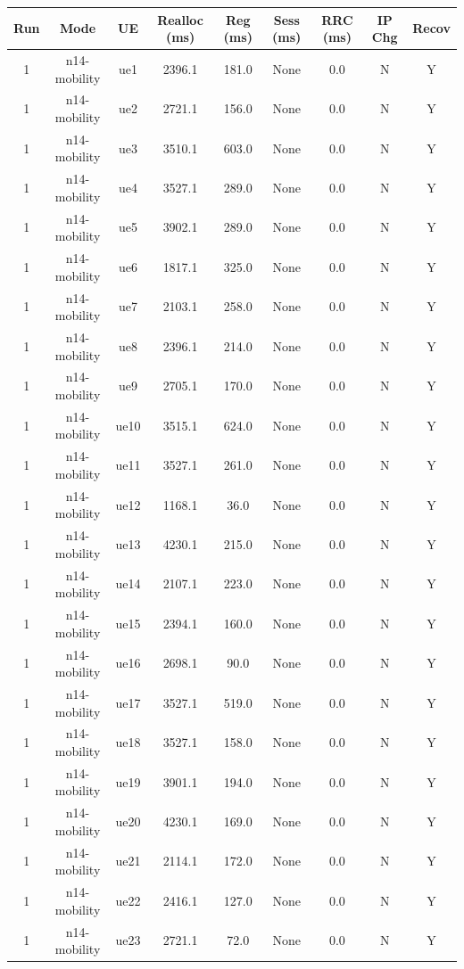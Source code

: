 \begin{table}[ht]
\centering
\begin{tabular}{|c|c|c|c|c|c|c|c|c|}
\hline
Run & Mode & UE & Realloc (ms) & Reg (ms) & Sess (ms) & RRC (ms) & IP Chg & Recov \\
\hline
1 & n14-mobility & ue1 & 2396.1 & 181.0 & None & 0.0 & N & Y \\
1 & n14-mobility & ue2 & 2721.1 & 156.0 & None & 0.0 & N & Y \\
1 & n14-mobility & ue3 & 3510.1 & 603.0 & None & 0.0 & N & Y \\
1 & n14-mobility & ue4 & 3527.1 & 289.0 & None & 0.0 & N & Y \\
1 & n14-mobility & ue5 & 3902.1 & 289.0 & None & 0.0 & N & Y \\
1 & n14-mobility & ue6 & 1817.1 & 325.0 & None & 0.0 & N & Y \\
1 & n14-mobility & ue7 & 2103.1 & 258.0 & None & 0.0 & N & Y \\
1 & n14-mobility & ue8 & 2396.1 & 214.0 & None & 0.0 & N & Y \\
1 & n14-mobility & ue9 & 2705.1 & 170.0 & None & 0.0 & N & Y \\
1 & n14-mobility & ue10 & 3515.1 & 624.0 & None & 0.0 & N & Y \\
1 & n14-mobility & ue11 & 3527.1 & 261.0 & None & 0.0 & N & Y \\
1 & n14-mobility & ue12 & 1168.1 & 36.0 & None & 0.0 & N & Y \\
1 & n14-mobility & ue13 & 4230.1 & 215.0 & None & 0.0 & N & Y \\
1 & n14-mobility & ue14 & 2107.1 & 223.0 & None & 0.0 & N & Y \\
1 & n14-mobility & ue15 & 2394.1 & 160.0 & None & 0.0 & N & Y \\
1 & n14-mobility & ue16 & 2698.1 & 90.0 & None & 0.0 & N & Y \\
1 & n14-mobility & ue17 & 3527.1 & 519.0 & None & 0.0 & N & Y \\
1 & n14-mobility & ue18 & 3527.1 & 158.0 & None & 0.0 & N & Y \\
1 & n14-mobility & ue19 & 3901.1 & 194.0 & None & 0.0 & N & Y \\
1 & n14-mobility & ue20 & 4230.1 & 169.0 & None & 0.0 & N & Y \\
1 & n14-mobility & ue21 & 2114.1 & 172.0 & None & 0.0 & N & Y \\
1 & n14-mobility & ue22 & 2416.1 & 127.0 & None & 0.0 & N & Y \\
1 & n14-mobility & ue23 & 2721.1 & 72.0 & None & 0.0 & N & Y \\

\end{tabular}
\end{table}
